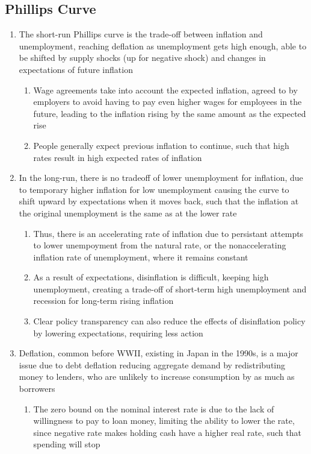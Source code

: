 \documentclass[11 pt, twoside]{article}
\begin{document}
\subsection{Phillips Curve}
\begin{enumerate}
\item The short-run Phillips curve is the trade-off between inflation and unemployment, reaching deflation as unemployment gets high enough, able to be shifted by supply shocks (up for negative shock) and changes in expectations of future inflation
\begin{enumerate}
\item Wage agreements take into account the expected inflation, agreed to by employers to avoid having to pay even higher wages for employees in the future, leading to the inflation rising by the same amount as the expected rise
\item People generally expect previous inflation to continue, such that high rates result in high expected rates of inflation
\end{enumerate}
\item In the long-run, there is no tradeoff of lower unemployment for inflation, due to temporary higher inflation for low unemployment causing the curve to shift upward by expectations when it moves back, such that the inflation at the original unemployment is the same as at the lower rate
\begin{enumerate}
\item Thus, there is an accelerating rate of inflation due to persistant attempts to lower unempoyment from the natural rate, or the nonaccelerating inflation rate of unemployment, where it remains constant
\item As a result of expectations, disinflation is difficult, keeping high unemployment, creating a trade-off of short-term high unemployment and recession for long-term rising inflation 
\item Clear policy transparency can also reduce the effects of disinflation policy by lowering expectations, requiring less action
\end{enumerate}
\item Deflation, common before WWII, existing in Japan in the 1990s, is a major issue due to debt deflation reducing aggregate demand by redistributing money to lenders, who are unlikely to increase consumption by as much as borrowers
\begin{enumerate}
\item The zero bound on the nominal interest rate is due to the lack of willingness to pay to loan money, limiting the ability to lower the rate, since negative rate makes holding cash have a higher real rate, such that spending will stop

\end{enumerate}
\end{enumerate}
\end{document}
